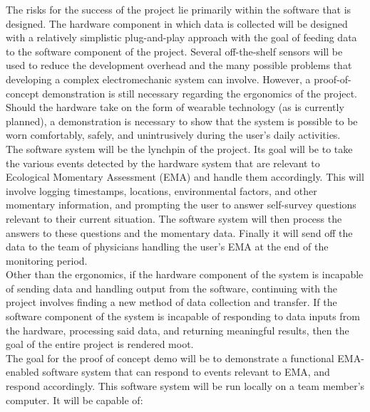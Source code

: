 \documentclass[12pt]{article}
\begin{document}
The risks for the success of the project lie primarily within the software that is designed. The hardware component in which data is collected will be designed with a relatively simplistic plug-and-play approach with the goal of feeding data to the software component of the project. Several off-the-shelf sensors will be used to reduce the development overhead and the many possible problems that developing a complex electromechanic system can involve. However, a proof-of-concept demonstration is still necessary regarding the ergonomics of the project. Should the hardware take on the form of wearable technology (as is currently planned), a demonstration is necessary to show that the system is possible to be worn comfortably, safely, and unintrusively during the user's daily activities.\\

The software system will be the lynchpin of the project. Its goal will be to take the various events detected by the hardware system that are relevant to Ecological Momentary Assessment (EMA) and handle them accordingly. This will involve logging timestamps, locations, environmental factors, and other momentary information, and prompting the user to answer self-survey questions relevant to their current situation. The software system will then process the answers to these questions and the momentary data. Finally it will send off the data to the team of physicians handling the user's EMA at the end of the monitoring period.\\

Other than the ergonomics, if the hardware component of the system is incapable of sending data and handling output from the software, continuing with the project involves finding a new method of data collection and transfer. If the software component of the system is incapable of responding to data inputs from the hardware, processing said data, and returning meaningful results, then the goal of the entire project is rendered moot.\\

The goal for the proof of concept demo will be to demonstrate a functional EMA-enabled software system that can respond to events relevant to EMA, and respond accordingly. This software system will be run locally on a team member's computer. It will be capable of:\\
\end{document}
